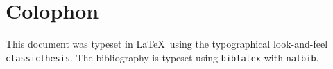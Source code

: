\pagestyle{empty}

\hfill

\vfill


\section*{Colophon}
This document was typeset in \LaTeX~using the typographical look-and-feel
\texttt{classicthesis}. The bibliography is typeset using \texttt{biblatex} with \texttt{natbib}.
